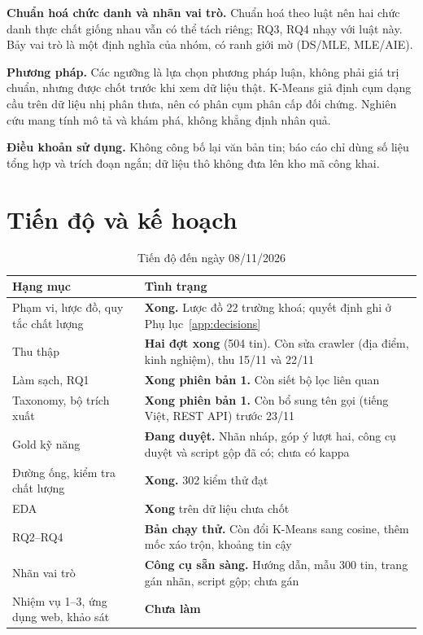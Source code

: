 \documentclass[12pt]{article}
\begin{document}
\textbf{Chuẩn hoá chức danh và nhãn vai trò.} Chuẩn hoá theo luật nên hai chức danh thực chất giống nhau vẫn có thể tách riêng; RQ3, RQ4 nhạy với luật này. Bảy vai trò là một định nghĩa của nhóm, có ranh giới mờ (DS/MLE, MLE/AIE).

\textbf{Phương pháp.} Các ngưỡng là lựa chọn phương pháp luận, không phải giá trị chuẩn, nhưng được chốt trước khi xem dữ liệu thật. K-Means giả định cụm dạng cầu trên dữ liệu nhị phân thưa, nên có phân cụm phân cấp đối chứng. Nghiên cứu mang tính mô tả và khám phá, không khẳng định nhân quả.

\textbf{Điều khoản sử dụng.} Không công bố lại văn bản tin; báo cáo chỉ dùng số liệu tổng hợp và trích đoạn ngắn; dữ liệu thô không đưa lên kho mã công khai.

\newpage
\section{Tiến độ và kế hoạch}
\label{sec:progress}

\begin{table}[htbp]
\centering
\caption{Tiến độ đến ngày 08/11/2026}
\label{tab:progress}
\renewcommand{\arraystretch}{1.15}
\begin{tabularx}{\textwidth}{>{\raggedright\arraybackslash}p{4.6cm} X}
\toprule
\textbf{Hạng mục} & \textbf{Tình trạng} \\
\midrule
Phạm vi, lược đồ, quy tắc chất lượng & \textbf{Xong.} Lược đồ 22 trường khoá; quyết định ghi ở Phụ lục~\ref{app:decisions} \\
Thu thập & \textbf{Hai đợt xong} (504 tin). Còn sửa crawler (địa điểm, kinh nghiệm), thu 15/11 và 22/11 \\
Làm sạch, RQ1 & \textbf{Xong phiên bản 1.} Còn siết bộ lọc liên quan \\
Taxonomy, bộ trích xuất & \textbf{Xong phiên bản 1.} Còn bổ sung tên gọi (tiếng Việt, REST API) trước 23/11 \\
Gold kỹ năng & \textbf{Đang duyệt.} Nhãn nháp, góp ý lượt hai, công cụ duyệt và script gộp đã có; chưa có kappa \\
Đường ống, kiểm tra chất lượng & \textbf{Xong.} 302 kiểm thử đạt \\
EDA & \textbf{Xong} trên dữ liệu chưa chốt \\
RQ2--RQ4 & \textbf{Bản chạy thử.} Còn đổi K-Means sang cosine, thêm mốc xáo trộn, khoảng tin cậy \\
Nhãn vai trò & \textbf{Công cụ sẵn sàng.} Hướng dẫn, mẫu 300 tin, trang gán nhãn, script gộp; chưa gán \\
Nhiệm vụ 1--3, ứng dụng web, khảo sát & \textbf{Chưa làm} \\
\bottomrule
\end{tabularx}
\end{table}
\end{document}
